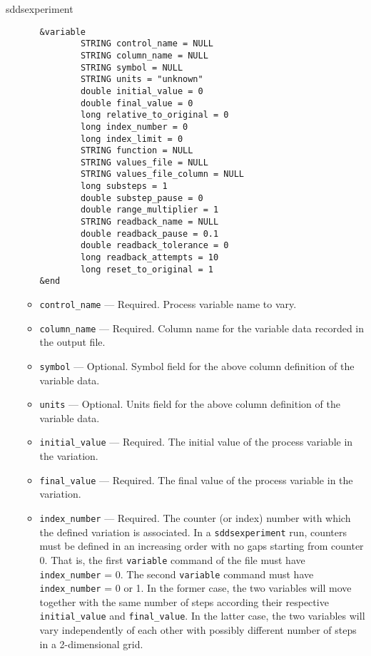 \begin{sddsprog}{sddsexperiment}
\begin{itemize}
\begin{itemize}
\begin{verbatim}
&variable
        STRING control_name = NULL
        STRING column_name = NULL
        STRING symbol = NULL
        STRING units = "unknown"
        double initial_value = 0
        double final_value = 0
        long relative_to_original = 0
        long index_number = 0
        long index_limit = 0
        STRING function = NULL
        STRING values_file = NULL
        STRING values_file_column = NULL
        long substeps = 1
        double substep_pause = 0
        double range_multiplier = 1
        STRING readback_name = NULL
        double readback_pause = 0.1
        double readback_tolerance = 0
        long readback_attempts = 10
        long reset_to_original = 1
&end        
\end{verbatim}
        \item {\verb+control_name+} --- Required. Process variable name to vary. 
        \item {\verb+column_name+} --- Required. Column name for the variable data recorded in the output file.
        \item {\verb+symbol+} --- Optional. Symbol field for the above column definition of the variable data.
        \item {\verb+units+} --- Optional. Units field for the above column definition of the variable data.
        \item {\verb+initial_value+} --- Required. The initial value of the process variable in the variation.
        \item {\verb+final_value+} --- Required. The final value of the process variable in the variation.
        \item {\verb+index_number+} --- Required. The counter (or index) number with which
                the defined variation is associated. In a \verb+sddsexperiment+ run, counters must
                be defined in an increasing order with no gaps starting from counter 0. That is,
                the first {\verb+variable+} command of the 
                file must have {\verb+index_number+} = 0. The second {\verb+variable+} command
                must have {\verb+index_number+} = 0 or 1. In the former case, the two variables
                will move together with the same number of steps according their respective
                {\verb+initial_value+} and {\verb+final_value+}. In the latter
                case, the two variables will vary independently of each other with possibly different
                number of steps in a 2-dimensional grid.


\end{itemize}
\end{itemize}
\end{sddsprog}
